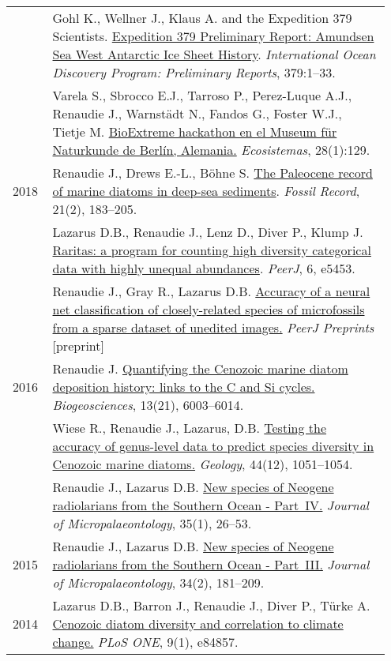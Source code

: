 \documentclass[11pt, a4paper]{article}
\makeatletter
\newcommand\fnoteref[1]{\protected@xdef\@theenmark{\ref{#1}}\@endnotemark}
\makeatother
\begin{document}
\begin{longtable}{@{}p{0.1\linewidth} >{\small}P{0.85\linewidth}@{}}
    & Gohl K., Wellner J., Klaus A. and the Expedition 379 Scientists\fnoteref{exp379scientists}. \href{http://publications.iodp.org/preliminary_report/379/index.html}{Expedition 379 Preliminary Report: Amundsen Sea West Antarctic Ice Sheet History}. \textit{International Ocean Discovery Program: Preliminary Reports}, 379:1--33.\\
    & Varela S., Sbrocco E.J., Tarroso P., Perez-Luque A.J., Renaudie J., Warnst\"{a}dt N., Fandos G., Foster W.J., Tietje M. \href{http://dx.doi.org/10.7818/ECOS.1707}{BioExtreme hackathon en el Museum f\"{u}r Naturkunde de Berlín, Alemania.} \textit{Ecosistemas}, 28(1):129.\\
2018 & Renaudie J., Drews E.-L., B\"{o}hne S. \href{http://dx.doi.org/10.5194/fr-21-183-2018}{The Paleocene record of marine diatoms in deep-sea sediments}. \textit{Fossil Record}, 21(2), 183--205.\\
    & Lazarus D.B., Renaudie J., Lenz D., Diver P., Klump J. \href{http://dx.doi.org/10.7717/peerj.5453}{Raritas: a program for counting high diversity categorical data with highly unequal abundances}. \textit{PeerJ}, 6, e5453.\\
    & Renaudie J., Gray R., Lazarus D.B. \href{https://peerj.com/preprints/27328/}{Accuracy of a neural net classification of closely-related species of microfossils from a sparse dataset of unedited images.} \textit{PeerJ Preprints} [preprint] \\
2016 & Renaudie J. \href{http://dx.doi.org/10.5194/bg-13-6003-2016}{Quantifying the Cenozoic marine diatom deposition history: links to the C and Si cycles.} \textit{Biogeosciences}, 13(21), 6003--6014.\\
    & Wiese R., Renaudie J., Lazarus, D.B. \href{http://dx.doi.org/10.1130/G38347.1}{Testing the accuracy of genus-level data to predict species diversity in Cenozoic marine diatoms.} \textit{Geology}, 44(12), 1051--1054.\\
    & Renaudie J., Lazarus D.B. \href{http://dx.doi.org/10.1144/jmpaleo2014-026}{New species of Neogene radiolarians from the Southern Ocean - Part IV.} \textit{Journal of Micropalaeontology}, 35(1), 26--53.\\
2015 & Renaudie J., Lazarus D.B. \href{http://dx.doi.org/10.1144/jmpaleo2013-034}{New species of Neogene radiolarians from the Southern Ocean - Part III.} \textit{Journal of Micropalaeontology}, 34(2), 181--209.\\
2014 & Lazarus D.B., Barron J., Renaudie J., Diver P., Türke A. \href{http://dx.doi.org/10.1371/journal.pone.0084857}{Cenozoic diatom diversity and correlation to climate change.} \textit{PLoS ONE}, 9(1), e84857.\\

\end{longtable}
\end{document}

